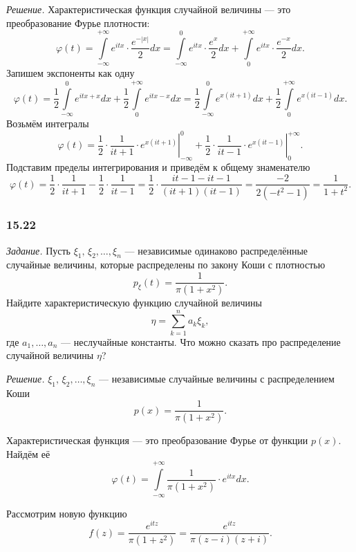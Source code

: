 \textit{Решение.} Характеристическая функция случайной величины --- это преобразование Фурье плотности:
$$ \varphi \left( t \right) =
  \int \limits_{- \infty }^{+ \infty } e^{itx} \cdot \frac{e^{- \left| x \right| }}{2} dx =
  \int \limits_{- \infty }^0 e^{itx} \cdot \frac{e^x}{2} dx +
  \int \limits_0^{+ \infty } e^{itx} \cdot \frac{e^{- x}}{2} dx.$$
Запишем экспоненты как одну
$$ \varphi \left( t \right) =
  \frac{1}{2} \int \limits_{- \infty }^0 e^{itx + x} dx +
  \frac{1}{2} \int \limits_0^{+ \infty } e^{itx - x} dx =
  \frac{1}{2} \int \limits_{- \infty }^0 e^{x \left( it + 1 \right) } dx +
  \frac{1}{2} \int \limits_0^{+ \infty } e^{x \left( it - 1 \right) }dx.$$
Возьмём интегралы
$$ \varphi \left( t \right) =
  \frac{1}{2} \cdot \left. \frac{1}{it + 1} \cdot
  e^{x \left( it + 1 \right) } \right|_{- \infty }^0 +
  \frac{1}{2} \cdot \left. \frac{1}{it - 1} \cdot
  e^{x \left( it - 1 \right) } \right|_0^{+ \infty }.$$
Подставим пределы интегрирования и приведём к общему знаменателю
$$ \varphi \left( t \right) =
  \frac{1}{2} \cdot \frac{1}{it + 1} - \frac{1}{2} \cdot \frac{1}{it - 1} =
  \frac{1}{2} \cdot \frac{it - 1 - it - 1}{ \left( it + 1 \right) \left( it - 1 \right) } =
  \frac{- 2}{2 \left( - t^2 - 1 \right) } =
  \frac{1}{1 + t^2}.$$

\subsubsection*{15.22}

\textit{Задание.}
Пусть $ \xi_1, \, \xi_2, \dotsc, \xi_n$ --- независимые одинаково распределённые случайные величины,
которые распределены по закону Коши с плотностью
$$p_{ \xi } \left( t \right) =
  \frac{1}{ \pi \left( 1 + x^2 \right) }.$$
Найдите характеристическую функцию случайной величины
$$ \eta =
  \sum \limits_{k=1}^n a_k \xi_k,$$
где $a_1, \dotsc, a_n$ --- неслучайные константы.
Что можно сказать про распределение случайной величины $ \eta $?

\textit{Решение.}
$ \xi_1, \, \xi_2, \dotsc, \xi_n$ --- независимые случайные величины с распределением Коши
$$p \left( x \right) =
  \frac{1}{ \pi \left( 1 + x^2 \right) }.$$

Характеристическая функция --- это преобразование Фурье от функции $p \left( x \right) $.
Найдём её
$$ \varphi \left( t \right) =
  \int \limits_{- \infty }^{+ \infty } \frac{1}{ \pi \left( 1 + x^2 \right) } \cdot e^{itx} dx.$$

Рассмотрим новую функцию
$$f \left( z \right) =
  \frac{e^{itz}}{ \pi \left( 1 + z^2 \right) } =
  \frac{e^{itz}}{ \pi \left( z - i \right) \left( z + i \right) }.$$

